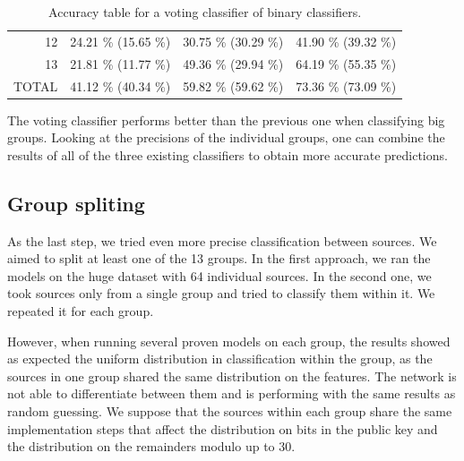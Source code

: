 \begin{table}[h]
\begin{tabular}{| r | c | c | c |}
12    & 24.21 \% {\color[HTML]{9B9B9B} (15.65 \%)} & 30.75 \% {\color[HTML]{9B9B9B} (30.29 \%)} & 41.90 \% {\color[HTML]{9B9B9B} (39.32 \%)} \\

13    & 21.81 \% {\color[HTML]{9B9B9B} (11.77 \%)} & 49.36 \% {\color[HTML]{9B9B9B} (29.94 \%)} & 64.19 \% {\color[HTML]{9B9B9B} (55.35 \%)} \\

\hline
TOTAL & 41.12 \% {\color[HTML]{9B9B9B} (40.34 \%)} & 59.82 \% {\color[HTML]{9B9B9B} (59.62 \%)} & 73.36 \% {\color[HTML]{9B9B9B} (73.09 \%)} \\
\hline                       
\end{tabular}
\caption{Accuracy table for a voting classifier of binary classifiers.}
\label{table-binary-voter}
\end{table}

The voting classifier performs better than the previous one when classifying big groups. Looking at the precisions of the individual groups, one can combine the results of all of the three existing classifiers to obtain more accurate predictions.

\subsection*{Group spliting}

As the last step, we tried even more precise classification between sources. We aimed to split at least one of the 13 groups. In the first approach, we ran the models on the huge dataset with 64 individual sources. In the second one, we took sources only from a single group and tried to classify them within it. We repeated it for each group.

However, when running several proven models on each group, the results showed as expected the uniform distribution in classification within the group, as the sources in one group shared the same distribution on the features. The network is not able to differentiate between them and is performing with the same results as random guessing. We suppose that the sources within each group share the same implementation steps that affect the distribution on bits in the public key and the distribution on the remainders modulo up to 30.

